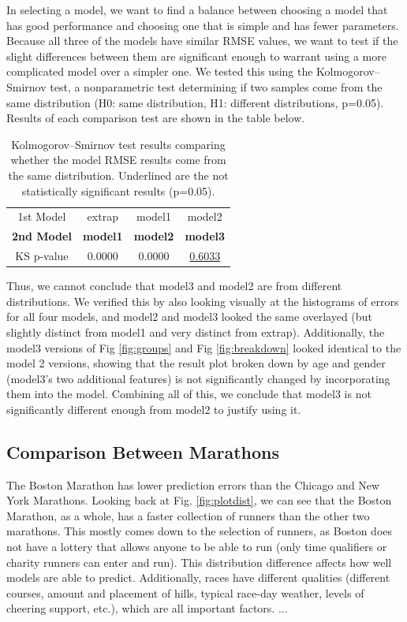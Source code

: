 \documentclass[USenglish,twocolumn]{article}
\theoremstyle{dgthm}
\theoremstyle{dgdef}
\begin{document}
In selecting a model, we want to find a balance between choosing a model that has good performance and choosing one that is simple and has fewer parameters. Because all three of the models have similar RMSE values, we want to test if the slight differences between them are significant enough to warrant using a more complicated model over a simpler one. We tested this using the Kolmogorov–Smirnov test, a nonparametric test determining if two samples come from the same distribution (H0: same distribution, H1: different distributions, p=0.05). Results of each comparison test are shown in the table below.

\begin{table}[!ht]
\centering
\begin{tabular}{c|ccc}
1st Model & extrap & model1 & model2 \\ %
\textbf{2nd Model} & \textbf{model1} & \textbf{model2} & \textbf{model3} \\ \midrule
KS p-value & 0.0000 & 0.0000 & \underline{0.6033} \\
 \end{tabular}
 \caption{Kolmogorov–Smirnov test results comparing whether the model RMSE results come from the same distribution. Underlined are the not statistically significant results (p=0.05).}
 \label{tab:kstest}
 \end{table}

Thus, we cannot conclude that model3 and model2 are from different distributions. We verified this by also looking visually at the histograms of errors for all four models, and model2 and model3 looked the same overlayed (but slightly distinct from model1 and very distinct from extrap). Additionally, the model3 versions of Fig \ref{fig:groups} and Fig \ref{fig:breakdown} looked identical to the model 2 versions, showing that the result plot broken down by age and gender (model3's two additional features) is not significantly changed by incorporating them into the model. Combining all of this, we conclude that model3 is not significantly different enough from model2 to justify using it.

\subsection{Comparison Between Marathons}
\label{marathoncomparesection}

The Boston Marathon has lower prediction errors than the Chicago and New York Marathons. Looking back at Fig. \ref{fig:plotdist}, we can see that the Boston Marathon, as a whole, has a faster collection of runners than the other two marathons. This mostly comes down to the selection of runners, as Boston does not have a lottery that allows anyone to be able to run (only time qualifiers or charity runners can enter and run). This distribution difference affects how well models are able to predict. Additionally, races have different qualities (different courses, amount and placement of hills, typical race-day weather, levels of cheering support, etc.), which are all important factors. ...
\end{document}
